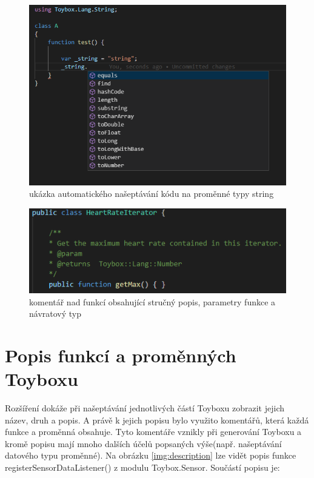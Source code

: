 \begin{figure}[tbh!]
	\centering
	\includegraphics[scale=0.85]{images/autocomplete_example}
	\caption{ukázka automatického našeptávání kódu na proměnné typy string}
	\label{img:autocomplete_example}
\end{figure}

\begin{figure}[b!]
	\centering
	\includegraphics{images/comments}
	\caption{komentář nad funkcí obsahující stručný popis, parametry funkce a návratový typ}
	\label{img:comments}
\end{figure}

\section{Popis funkcí a proměnných Toyboxu}
Rozšíření dokáže při našeptávání jednotlivých částí Toyboxu zobrazit jejich název, druh a popis. A právě k jejich popisu bylo využito komentářů, která každá funkce a proměnná obsahuje. Tyto komentáře vznikly při generování Toyboxu a kromě popisu mají mnoho dalších účelů popsaných výše(např. našeptávání datového typu proměnné).
Na obrázku \ref{img:description} lze vidět popis funkce registerSensorDataListener() z modulu Toybox.Sensor. Součástí popisu je:

